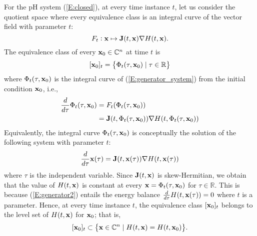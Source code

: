 For the pH system (\ref{E:closed}), at every time instance $t$, let us consider the quotient space where every equivalence class is an integral curve of the vector field with parameter $t$:
\begin{equation} \label{E:generator_system}
    F_t: \mathbf{x} \mapsto \mathbf{J}(t, \mathbf{x}) \nabla H(t, \mathbf{x}).
\end{equation}
The equivalence class of every $\mathbf{x}_0 \in \mathbb{C}^n$ at time $t$ is
\begin{equation} \label{E:equivalence_class}
    [\mathbf{x}_0]_t = \big\{\Phi_t(\tau, \mathbf{x}_0)\mid \tau\in \mathbb{R}\big\}
\end{equation}
where $\Phi_t(\tau, \mathbf{x}_0)$ is the integral curve of (\ref{E:generator_system}) from the initial condition $\mathbf{x}_0$, i.e.,
\begin{align*}
    \frac{d}{d\tau} \Phi_t(\tau, \mathbf{x}_0) &= F_t(\Phi_t(\tau, \mathbf{x}_0)) \\
    &= \mathbf{J}(t, \Phi_t(\tau, \mathbf{x}_0)) \nabla H(t, \Phi_t(\tau, \mathbf{x}_0))
\end{align*}
Equivalently, the integral curve $\Phi_t(\tau, \mathbf{x}_0)$ is conceptually the solution of the following system with parameter $t$:
\begin{equation} \label{E:generator2}
    \frac{d}{d\tau} \mathbf{x}(\tau) = \mathbf{J}(t, \mathbf{x}(\tau)) \nabla H(t, \mathbf{x}(\tau))
\end{equation}
where $\tau$ is the independent variable.
Since $\mathbf{J}(t, \mathbf{x})$ is skew-Hermitian, we obtain that the value of $H(t, \mathbf{x})$ is constant at every $\mathbf{x} = \Phi_t(\tau, \mathbf{x}_0)$ for $\tau \in \mathbb{R}$. This is because (\ref{E:generator2}) entails the energy balance $\frac{d}{d\tau} H(t, \mathbf{x}(\tau)) = 0$ where $t$ is a parameter. Hence, at every time instance $t$, the equivalence class $[\mathbf{x}_0]_t$ belongs to the level set of $H(t, \mathbf{x})$ for $\mathbf{x}_0$; that is,
\begin{equation} \label{E:contain_in_level}
    [\mathbf{x}_0]_t \subset \big\{\mathbf{x} \in \mathbb{C}^n \mid H(t, \mathbf{x}) = H(t, \mathbf{x}_0) \big\}. 
\end{equation}


